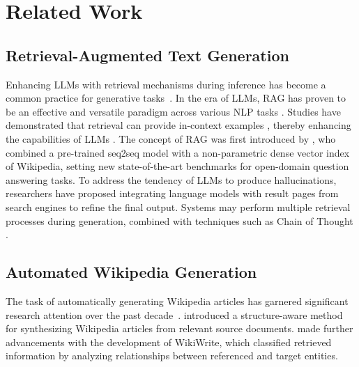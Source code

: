 \documentclass[11pt]{article}
\begin{document}
\section{Related Work}
\subsection{Retrieval-Augmented Text Generation}
Enhancing LLMs with retrieval mechanisms during inference has become a common practice for generative tasks~\citep{li2022survey, gao2023retrieval, guu2020retrieval}. In the era of LLMs, RAG has proven to be an effective and versatile paradigm across various NLP tasks \citep{weston2018retrieve, jiang2023active}. Studies have demonstrated that retrieval can provide in-context examples \citep{brown2020language}, thereby enhancing the capabilities of LLMs \citep{huang2023raven, ram2023context, chen2023exploring}. The concept of RAG was first introduced by \citet{lewis2020retrieval}, who combined a pre-trained seq2seq model with a non-parametric dense vector index of Wikipedia, setting new state-of-the-art benchmarks for open-domain question answering tasks. To address the tendency of LLMs to produce hallucinations, researchers \citep{nakano2021webgpt} have proposed integrating language models with result pages from search engines to refine the final output. Systems may perform multiple retrieval processes during generation,  combined with techniques such as Chain of Thought \citep{trivedi2022interleaving, feng2023retrieval}.

\subsection{Automated Wikipedia Generation}
The task of automatically generating Wikipedia articles has garnered significant research attention over the past decade~\cite{sauper2009automatically,liu2018generating,perez2019generating,banerjee2016wikiwrite}. \citet{sauper2009automatically} introduced a structure-aware method for synthesizing Wikipedia articles from relevant source documents. \citet{banerjee2016wikiwrite} made further advancements with the development of WikiWrite, which classified retrieved information by analyzing relationships between referenced and target entities.
\end{document}
